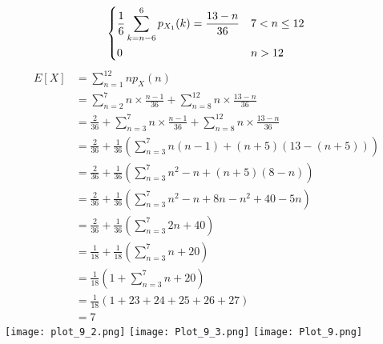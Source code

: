 \documentclass{article}
\begin{document}
\begin{multicols}{2}
\[\begin{dcases}
           \frac{1}{6}\sum_{k=n-6}^6 p_{X_1}(k)=\frac{13-n}{36} & 7 < n \leq 12 \\
           0 & n>12
           \end{dcases}\]
\begin{align}
    E[X]&=\sum_{n=1}^{12} n p_{X}(n) \nonumber \\
        &=\sum_{n=2}^7 n\times \frac{n-1}{36}+\sum_{n=8}^{12} n \times \frac{13-n}{36} \nonumber \\
        &=\frac{2}{36}+\sum_{n=3}^7 n\times \frac{n-1}{36}+\sum_{n=8}^{12}n\times \frac{13-n}{36}\nonumber \\
        &=\frac{2}{36}+\frac{1}{36}\left(\sum_{n=3}^7n(n-1)+(n+5)(13-(n+5))\right) \nonumber \\
        &=\frac{2}{36}+\frac{1}{36}\left(\sum_{n=3}^7 n^2-n+(n+5)(8-n)\right) \nonumber \\
        &=\frac{2}{36}+\frac{1}{36}\left(\sum_{n=3}^7 n^2-n+8n-n^2+40-5n\right) \nonumber \\
        &=\frac{2}{36}+\frac{1}{36}\left(\sum_{n=3}^7 2n+40 \right) \nonumber \\
        &=\frac{1}{18}+\frac{1}{18}\left(\sum_{n=3}^7 n+20\right) \nonumber \\
        &=\frac{1}{18}\left(1+\sum_{n=3}^7 n+20 \right) \nonumber \\
        &=\frac{1}{18}\left(1+23+24+25+26+27\right) \nonumber \\
        &=7 \nonumber
\end{align}
\texttt{[image: plot\_9\_2.png]}
\texttt{[image: Plot\_9\_3.png]}
\texttt{[image: Plot\_9.png]}



\end{multicols}
\end{document}
